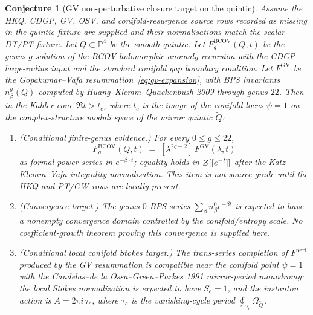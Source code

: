 \documentclass[12pt]{amsart}
\newtheorem{conj}[thm]{Conjecture}
\theoremstyle{remark}
\renewcommand{\P}{\mathbb{P}}
\begin{document}
\begin{conj}[GV non-perturbative closure target on the quintic]
  \label{conj:bcov-np-quintic}
  Assume the HKQ, CDGP, GV, OSV, and conifold-resurgence source rows
  recorded as missing in the quintic fixture are supplied and their
  normalisations match the scalar DT/PT fixture.
  Let $Q \subset \P^4$ be the smooth quintic. Let
  $F^{\mathrm{BCOV}}_g(Q, t)$ be the genus-$g$ solution of the BCOV
  holomorphic anomaly recursion with the CDGP large-radius input and the
  standard conifold gap boundary condition. Let $F^{\mathrm{GV}}$ be the
  Gopakumar--Vafa resummation~\eqref{eq:gv-expansion}, with BPS
  invariants $n_\beta^g(Q)$ computed by Huang--Klemm--Quackenbush 2009
  through genus $22$. Then in the Kahler cone $\Re t > t_c$, where
  $t_c$ is the image of the conifold locus $\psi = 1$ on the
  complex-structure moduli space of the mirror quintic $\widetilde Q$:
  \begin{enumerate}
    \item[(i)] \emph{(Conditional finite-genus evidence.)} For every
      $0 \leq g \leq 22$,
      \[
        F^{\mathrm{BCOV}}_g(Q, t) \;=\; [\lambda^{2g - 2}]\, F^{\mathrm{GV}}(\lambda, t)
      \]
      as formal power series in $e^{-\beta \cdot t}$; equality holds in
      $Z[[e^{-t}]]$ after the Katz--Klemm--Vafa integrality normalisation.
      This item is not source-grade until the HKQ and PT/GW rows are
      locally present.
    \item[(ii)] \emph{(Convergence target.)}
      The genus-$0$ BPS series $\sum_\beta n_\beta^0 e^{-\beta t}$ is
      expected to have a nonempty convergence domain controlled by the
      conifold/entropy scale.  No coefficient-growth theorem proving this
      convergence is supplied here.
    \item[(iii)] \emph{(Conditional local conifold Stokes target.)} The trans-series
      completion of $F^{\mathrm{pert}}$ produced by the GV resummation
      is compatible near the conifold point $\psi = 1$ with the
      Candelas--de la Ossa--Green--Parkes 1991 mirror-period monodromy:
      the local Stokes normalization is expected to have \(S_c=1\), and
      the instanton action is \(A=2\pi i\,\tau_c\), where \(\tau_c\) is the
      vanishing-cycle period $\oint_{\gamma_c} \Omega_{\widetilde Q}$.
  \end{enumerate}
\end{conj}
\end{document}
